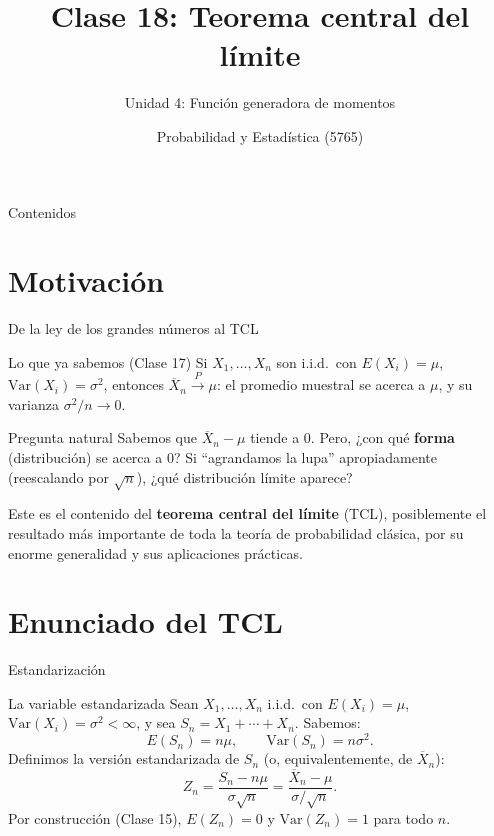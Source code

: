 \documentclass[aspectratio=169,11pt]{beamer}
\title[Prob. y Estadística]{Clase 18: Teorema central del límite}
\subtitle{Unidad 4: Función generadora de momentos}
\institute[UNS]{Universidad Nacional del Sur \\ Departamento de Matemática}
\author{Probabilidad y Estadística (5765)}
\date{}
\begin{document}
\begin{frame}
\titlepage
\end{frame}

\begin{frame}{Contenidos}
\tableofcontents
\end{frame}

\section{Motivación}

\begin{frame}{De la ley de los grandes números al TCL}
\begin{block}{Lo que ya sabemos (Clase 17)}
Si $X_1,\dots,X_n$ son i.i.d.\ con $E(X_i)=\mu$, $\text{Var}(X_i)=\sigma^2$, entonces $\overline{X}_n \xrightarrow{P} \mu$: el promedio muestral se acerca a $\mu$, y su varianza $\sigma^2/n \to 0$.
\end{block}

\begin{alertblock}{Pregunta natural}
Sabemos que $\overline{X}_n - \mu$ tiende a $0$. Pero, ¿con qué \textbf{forma} (distribución) se acerca a $0$? Si ``agrandamos la lupa'' apropiadamente (reescalando por $\sqrt n$), ¿qué distribución límite aparece?
\end{alertblock}

Este es el contenido del \textbf{teorema central del límite} (TCL), posiblemente el resultado más importante de toda la teoría de probabilidad clásica, por su enorme generalidad y sus aplicaciones prácticas.
\end{frame}

\section{Enunciado del TCL}

\begin{frame}{Estandarización}
\begin{block}{La variable estandarizada}
Sean $X_1,\dots,X_n$ i.i.d.\ con $E(X_i)=\mu$, $\text{Var}(X_i)=\sigma^2 < \infty$, y sea $S_n = X_1+\cdots+X_n$. Sabemos:
\[
E(S_n) = n\mu, \qquad \text{Var}(S_n) = n\sigma^2.
\]
Definimos la versión estandarizada de $S_n$ (o, equivalentemente, de $\overline{X}_n$):
\[
Z_n = \frac{S_n - n\mu}{\sigma\sqrt{n}} = \frac{\overline{X}_n - \mu}{\sigma/\sqrt{n}}.
\]
Por construcción (Clase 15), $E(Z_n) = 0$ y $\text{Var}(Z_n) = 1$ para todo $n$.
\end{block}
\end{frame}
\end{document}
